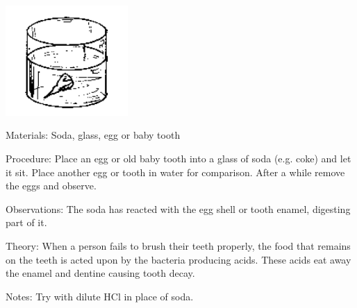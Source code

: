 \begin{multicols}{2}
\begin{center}
\includegraphics[width=0.35\textwidth]{./img/source/tooth-decay.png}
\end{center}

\begin{description*}
\item[Materials:]{Soda, glass, egg or baby tooth}
\item[Procedure:]{Place an egg or old baby tooth into a glass of soda (e.g. coke) and let it sit. Place another egg or tooth in water for comparison. After a while remove the eggs and observe.}
\item[Observations:]{The soda has reacted with the egg shell or tooth enamel, digesting part of it.}
\item[Theory:]{When a person fails to brush their teeth properly, the food that remains on the teeth is acted
upon by the bacteria producing acids. These acids eat away the enamel and dentine causing
tooth decay.}
\item[Notes:]{Try with dilute HCl in place of soda.}
\end{description*}

%
%


\end{multicols}
